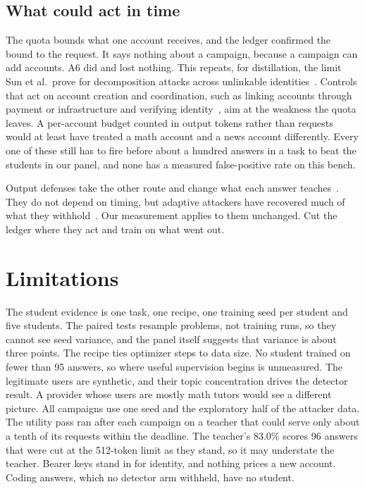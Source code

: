 \documentclass[journal]{IEEEtran}
\begin{document}
\subsection{What could act in time}
The quota bounds what one account receives, and the ledger confirmed the bound to the request. It says nothing about a campaign, because a campaign can add accounts. A6 did and lost nothing. This repeats, for distillation, the limit Sun et al.\ prove for decomposition attacks across unlinkable identities~\cite{sun2026decomposition}. Controls that act on account creation and coordination, such as linking accounts through payment or infrastructure and verifying identity~\cite{anthropic2026detecting,openai2026disrupting}, aim at the weakness the quota leaves. A per-account budget counted in output tokens rather than requests would at least have treated a math account and a news account differently. Every one of these still has to fire before about a hundred answers in a task to beat the students in our panel, and none has a measured false-positive rate on this bench.

Output defenses take the other route and change what each answer teaches~\cite{savani2025antidistillation,ma2026tracerewriting}. They do not depend on timing, but adaptive attackers have recovered much of what they withhold~\cite{libon2026break,allouah2026game,zhu2026learnability}. Our measurement applies to them unchanged. Cut the ledger where they act and train on what went out.

\section{Limitations}
\label{sec:limits}
The student evidence is one task, one recipe, one training seed per student and five students. The paired tests resample problems, not training runs, so they cannot see seed variance, and the panel itself suggests that variance is about three points. The recipe ties optimizer steps to data size. No student trained on fewer than 95 answers, so where useful supervision begins is unmeasured. The legitimate users are synthetic, and their topic concentration drives the detector result. A provider whose users are mostly math tutors would see a different picture. All campaigns use one seed and the exploratory half of the attacker data. The utility pass ran after each campaign on a teacher that could serve only about a tenth of its requests within the deadline. The teacher's 83.0\% scores 96 answers that were cut at the 512-token limit as they stand, so it may understate the teacher. Bearer keys stand in for identity, and nothing prices a new account. Coding answers, which no detector arm withheld, have no student.
\end{document}
